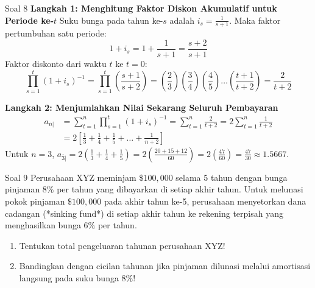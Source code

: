 \documentclass[11pt,a4paper]{article}
\begin{document}
\begin{solutionbox}{Soal 8}
\textbf{Langkah 1: Menghitung Faktor Diskon Akumulatif untuk Periode ke-$t$}
Suku bunga pada tahun ke-$s$ adalah $i_s = \frac{1}{s+1}$. Maka faktor pertumbuhan satu periode:
\begin{equation*}
    1 + i_s = 1 + \frac{1}{s+1} = \frac{s+2}{s+1}
\end{equation*}
Faktor diskonto dari waktu $t$ ke $t=0$:
\begin{equation*}
    \prod_{s=1}^t (1 + i_s)^{-1} = \prod_{s=1}^t \left( \frac{s+1}{s+2} \right) = \left(\frac{2}{3}\right) \left(\frac{3}{4}\right) \left(\frac{4}{5}\right) \dots \left(\frac{t+1}{t+2}\right) = \frac{2}{t+2}
\end{equation*}

\textbf{Langkah 2: Menjumlahkan Nilai Sekarang Seluruh Pembayaran}
\begin{align*}
    a_{\overline{n}|} &= \sum_{t=1}^n \prod_{s=1}^t (1+i_s)^{-1} = \sum_{t=1}^n \frac{2}{t+2} = 2 \sum_{t=1}^n \frac{1}{t+2} \\[0.4em]
                      &= 2 \left[ \frac{1}{3} + \frac{1}{4} + \frac{1}{5} + \dots + \frac{1}{n+2} \right]
\end{align*}
Untuk $n = 3$, $a_{\overline{3}|} = 2\left(\frac{1}{3} + \frac{1}{4} + \frac{1}{5}\right) = 2\left(\frac{20 + 15 + 12}{60}\right) = 2\left(\frac{47}{60}\right) = \frac{47}{30} \approx \mathbf{1.5667}$.
\end{solutionbox}

\vspace{1.5em}

\begin{problembox}{Soal 9}
Perusahaan XYZ meminjam $\$100{,}000$ selama 5 tahun dengan bunga pinjaman $8\%$ per tahun yang dibayarkan di setiap akhir tahun. Untuk melunasi pokok pinjaman $\$100{,}000$ pada akhir tahun ke-5, perusahaan menyetorkan dana cadangan (*sinking fund*) di setiap akhir tahun ke rekening terpisah yang menghasilkan bunga $6\%$ per tahun.
\begin{enumerate}[label=(\alph*)]
    \item Tentukan total pengeluaran tahunan perusahaan XYZ!
    \item Bandingkan dengan cicilan tahunan jika pinjaman dilunasi melalui amortisasi langsung pada suku bunga $8\%$!
\end{enumerate}
\end{problembox}
\end{document}
